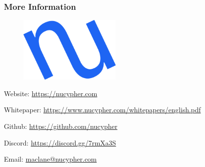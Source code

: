 \documentclass[xetex,mathsans,sans]{beamer}
\begin{document}
    \begin{frame}
        \frametitle{More Information}
        \begin{figure}
            \centering
            \includegraphics[width=5cm]{pdf/nucypher_logo.pdf}
        \end{figure}
        Website: \url{https://nucypher.com}

        Whitepaper: \url{https://www.nucypher.com/whitepapers/english.pdf}

        Github: \url{https://github.com/nucypher}

        Discord: \url{https://discord.gg/7rmXa3S}

        Email: \href{mailto:maclane@nucypher.com}{maclane@nucypher.com}
    \end{frame}
\end{document}

